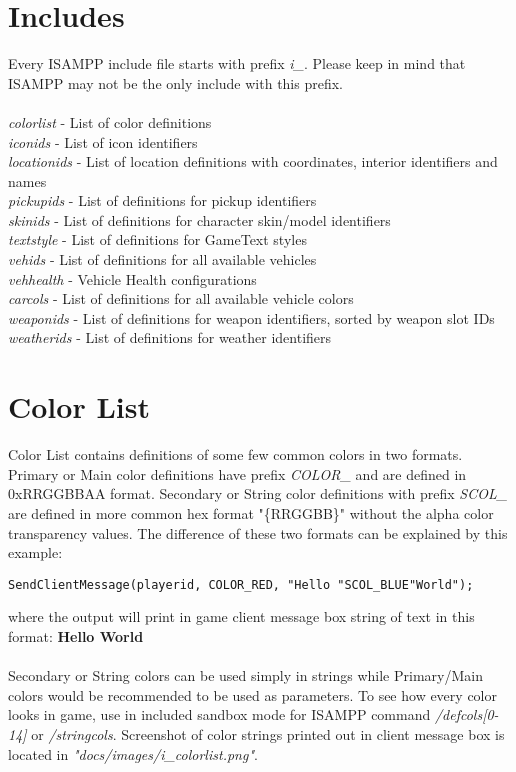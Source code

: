 \documentclass{article}
\begin{document}
\newpage
\section{Includes}
Every ISAMPP include file starts with prefix \textit{i\_}. Please keep in mind that ISAMPP may not be the only include with this prefix.
\\
\\
\textit{colorlist} - List of color definitions
\\
\textit{iconids} - List of icon identifiers
\\
\textit{locationids} - List of location definitions with coordinates, interior identifiers and names
\\
\textit{pickupids} - List of definitions for pickup identifiers
\\
\textit{skinids} - List of definitions for character skin/model identifiers
\\
\textit{textstyle} - List of definitions for GameText styles
\\
\textit{vehids} - List of definitions for all available vehicles
\\
\textit{vehhealth} - Vehicle Health configurations
\\
\textit{carcols} - List of definitions for all available vehicle colors
\\
\textit{weaponids} - List of definitions for weapon identifiers, sorted by weapon slot IDs
\\
\textit{weatherids} - List of definitions for weather identifiers


\newpage
\section{Color List}
Color List contains definitions of some few common colors in two formats. Primary or Main color definitions have prefix \textit{COLOR\_} and are defined in 0xRRGGBBAA format. Secondary or String color definitions with prefix \textit{SCOL\_} are defined in more common hex format "\{RRGGBB\}" without the alpha color transparency values. The difference of these two formats can be explained by this example:
\begin{verbatim}
SendClientMessage(playerid, COLOR_RED, "Hello "SCOL_BLUE"World");
\end{verbatim}
where the output will print in game client message box string of text in this format:
\textbf{\color{red}Hello \color{blue}World}\\
\\
Secondary or String colors can be used simply in strings while Primary/Main colors would be recommended to be used as parameters. To see how every color looks in game, use in included sandbox mode for ISAMPP command \textit{/defcols[0-14]} or \textit{/stringcols}. Screenshot of color strings printed out in client message box is located in \textit{"docs/images/i\_colorlist.png"}.
\end{document}
